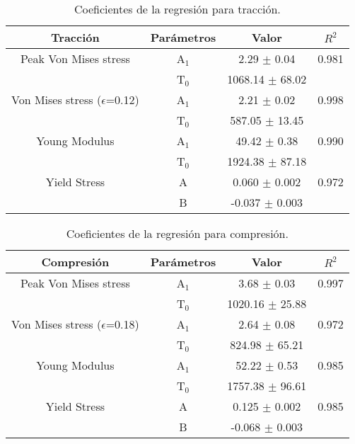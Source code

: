 \begin{table}[htp]
\begin{center}
\begin{tabular}{*{4}{c}}
\hline
\textbf{Tracción} & Parámetros & Valor & $R^{2}$ \\ \hline \hline
Peak Von Mises stress & A$_{1}$ & 2.29 $\pm$ 0.04 & 0.981 \\
 & T$_{0}$ & 1068.14 $\pm$ 68.02 & \\ \hline
Von Mises stress ($\epsilon$=0.12) & A$_{1}$ & 2.21 $\pm$ 0.02 & 0.998 \\
 & T$_{0}$ & 587.05 $\pm$ 13.45 & \\ \hline
Young Modulus & A$_{1}$ & 49.42 $\pm$ 0.38 & 0.990 \\
 & T$_{0}$ & 1924.38 $\pm$ 87.18 & \\ \hline
Yield Stress & A & 0.060 $\pm$ 0.002 & 0.972 \\
 & B & -0.037 $\pm$ 0.003 & \\ \hline
\end{tabular}
\end{center}
\caption[Coeficientes de la regresión para tracción]{Coeficientes de la regresión para tracción.}
\label{C3:tb:initPropsTen}
\end{table}

\begin{table}[htp]
\begin{center}
\begin{tabular}{*{4}{c}}
\hline
\textbf{Compresión} & Parámetros & Valor & $R^{2}$ \\ \hline \hline
Peak Von Mises stress & A$_{1}$ & 3.68 $\pm$ 0.03 & 0.997 \\
 & T$_{0}$ & 1020.16 $\pm$ 25.88 & \\ \hline
Von Mises stress ($\epsilon$=0.18) & A$_{1}$ & 2.64 $\pm$ 0.08 & 0.972 \\
 & T$_{0}$ & 824.98 $\pm$ 65.21 & \\ \hline
Young Modulus & A$_{1}$ & 52.22 $\pm$ 0.53 & 0.985 \\
 & T$_{0}$ & 1757.38 $\pm$ 96.61 & \\ \hline
Yield Stress & A & 0.125 $\pm$ 0.002 & 0.985 \\
 & B & -0.068 $\pm$ 0.003 & \\ \hline
\end{tabular}
\end{center}
\caption[Coeficientes de la regresión para compresión]{Coeficientes de la regresión para compresión.}
\label{C3:tb:initPropsComp}
\end{table}


